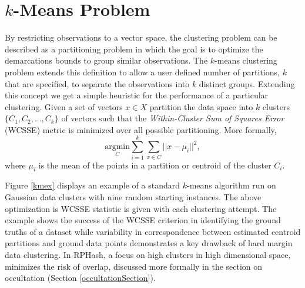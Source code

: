\section{$k$-Means Problem}

By restricting observations to a vector space, the clustering problem can be described as a partitioning problem in
which the goal is to optimize the demarcations bounds to group similar observations.  The $k$-means clustering problem
extends this definition to allow a user defined number of partitions, $k$ that are specified, to separate the
observations into $k$ distinct groups.  Extending this concept we get a simple heuristic for the performance of a
particular clustering.  Given a set of vectors $x\in X$ partition the data space into $k$ clusters $\{C_1, C_2, ...,
C_k\}$ of vectors such that the \emph{Within-Cluster Sum of Squares Error} (WCSSE) metric is minimized over all possible
partitioning.  More formally,
$$
{\underset{C}{\text{argmin}}} {\overset{k}{\underset{i=1}{\sum}}} {\underset{x\in C}{\sum}}
||x-\mu_i||^2, 
$$
where $\mu_i$ is the mean of the points in a partition or centroid of the cluster $C_i$. 

Figure \ref{kmex} displays an example of a standard $k$-means algorithm run on Gaussian data clusters with nine random
starting instances.  The above optimization is WCSSE statistic is given with each clustering attempt.  The example shows
the success of the WCSSE criterion in identifying the ground truths of a dataset while variability in correspondence
between estimated centroid partitions and ground data points demonstrates a key drawback of hard margin data clustering.
In \textsf{RPHash}, a focus on high clusters in high dimensional space, minimizes the risk of overlap, discussed more formally in
the section on occultation (Section \ref{occultationSection}).

